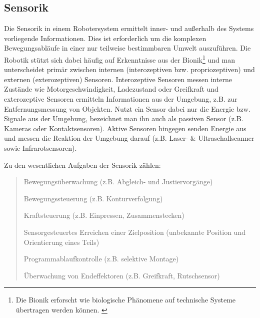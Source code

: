 \documentclass[11pt,ngerman,parskip=half]{scrartcl}
\begin{document}
\subsection{Sensorik}
\label{subsec:john_sensorik}
Die Sensorik in einem Robotersystem ermittelt inner- und außerhalb des
Systems vorliegende Informationen. Dies ist erforderlich um die komplexen
Bewegungsabläufe in einer nur teilweise bestimmbaren Umwelt auszuführen. Die
Robotik stützt sich dabei häufig auf Erkenntnisse aus der Bionik\footnote{
Die Bionik erforscht wie biologische Phänomene auf technische Systeme
übertragen werden können. \parencite{feess_definition:_2018}} und man
unterscheidet primär zwischen internen (interozeptiven bzw. propriozeptiven)
und externen (exterozeptiven) Sensoren. Interozeptive Sensoren messen interne
Zustände wie Motorgeschwindigkeit, Ladezustand oder Greifkraft und
exterozeptive Sensoren ermitteln Informationen aus der Umgebung, z.B. zur
Entfernungsmessung von Objekten. Nutzt ein Sensor dabei nur die Energie bzw.
Signale aus der Umgebung, bezeichnet man ihn auch als passiven Sensor (z.B.
Kameras oder Kontaktsensoren). Aktive Sensoren hingegen senden Energie aus
und messen die Reaktion der Umgebung darauf (z.B. Laser- \&
Ultraschallscanner sowie Infrarotsensoren).
\parencites[vgl.][23\psq]{hertzberg_mobile_2012}[][73]
{kruse_mehrobjekt-zustandsschatzung_2013}[][97]{hesse_taschenbuch_2016}

Zu den wesentlichen Aufgaben der Sensorik zählen:
\blockquote[{\cite[][97]{hesse_taschenbuch_2016}}]{
  \begin{compactitem}
    \item Bewegungsüberwachung (z.B. Abgleich- und Justiervorgänge)
    \item Bewegungssteuerung (z.B. Konturverfolgung)
    \item Kraftsteuerung (z.B. Einpressen, Zusammenstecken)
    \item Sensorgesteuertes Erreichen einer Zielposition (unbekannte Position
          und Orientierung eines Teils)
    \item Programmablaufkontrolle (z.B. selektive Montage)
    \item Überwachung von Endeffektoren (z.B. Greifkraft, Rutschsensor)
  \end{compactitem}
}
\end{document}
